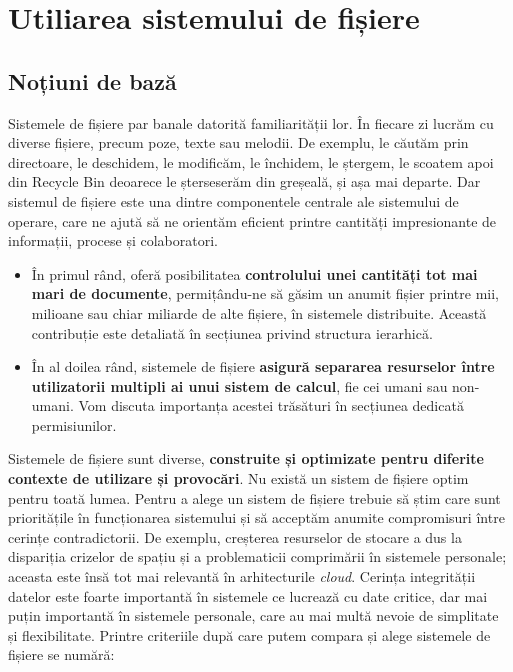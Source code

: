 \chapter{Utiliarea sistemului de fișiere}

\section{Noțiuni de bază}

Sistemele de fișiere par banale datorită familiarității lor. În fiecare zi
lucrăm cu diverse fișiere, precum poze, texte sau melodii. De exemplu, le
căutăm prin directoare, le deschidem, le modificăm, le închidem, le ștergem, le
scoatem apoi din Recycle Bin deoarece le șterseserăm din greșeală, și așa mai
departe. Dar sistemul de fișiere este una dintre componentele centrale ale
sistemului de operare, care ne ajută să ne orientăm eficient printre cantități
impresionante de informații, procese și colaboratori.

\begin{itemize}
	\item În primul rând, oferă posibilitatea \textbf{controlului unei
		cantități tot mai mari de documente}, permițându-ne să găsim un
		anumit fișier printre mii, milioane sau chiar miliarde de alte
		fișiere, în sistemele distribuite. Această contribuție este
		detaliată în secțiunea privind structura ierarhică.
	\item În al doilea rând, sistemele de fișiere \textbf{asigură separarea
		resurselor între utilizatorii multipli ai unui sistem de
		calcul}, fie cei umani sau non-umani. Vom discuta importanța
		acestei trăsături în secțiunea dedicată permisiunilor.
\end{itemize}

Sistemele de fișiere sunt diverse, \textbf{construite și optimizate pentru
diferite contexte de utilizare și provocări}. Nu există un sistem de fișiere
optim pentru toată lumea. Pentru a alege un sistem de fișiere trebuie să știm
care sunt prioritățile în funcționarea sistemului și să acceptăm anumite
compromisuri între cerințe contradictorii. De exemplu, creșterea resurselor de
stocare a dus la dispariția crizelor de spațiu și a problematicii comprimării în
sistemele personale; aceasta este însă tot mai relevantă în arhitecturile
\textit{cloud}. Cerința integrității datelor este foarte importantă în sistemele
ce lucrează cu date critice, dar mai puțin importantă în sistemele personale,
care au mai multă nevoie de simplitate și flexibilitate. Printre criteriile după
care putem compara și alege sistemele de fișiere se numără:

